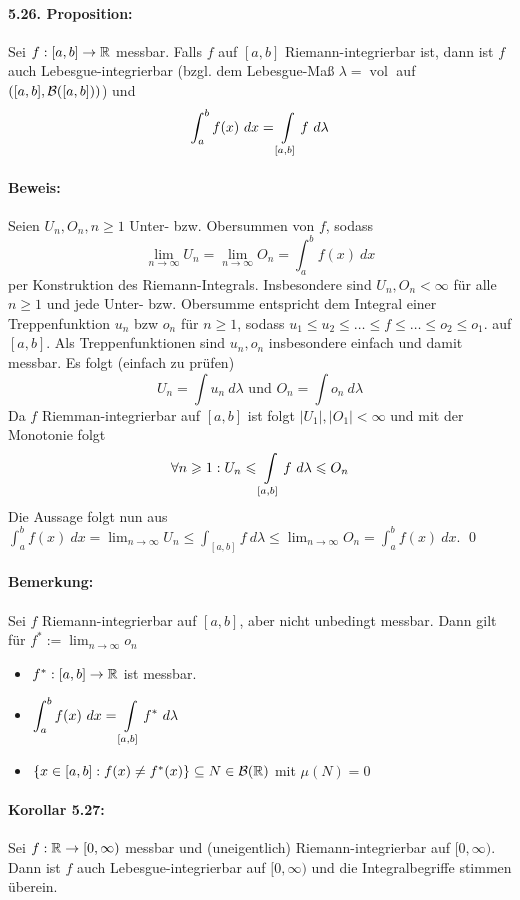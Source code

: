  \paragraph{5.26. Proposition:}Sei $f:[a,b]\to\R$ messbar. Falls $f$ auf $[a,b]$ Riemann-integrierbar ist, dann ist $f$ auch Lebesgue-integrierbar (bzgl. dem Lebesgue-Ma\ss{} $\lambda=\operatorname{vol}$ auf $([a,b],\cB([a,b]))$) und
 $$\int_a^b f(x)\ dx=\int\displaylimits_{[a,b]}f\ d\lambda$$
 
 \paragraph{Beweis:}Seien $U_n,O_n,n\geq1$ Unter- bzw. Obersummen von $f$, sodass
 $$\lim_{n\to\infty}U_n=\lim_{n\to\infty}O_n=\int_a^b f(x)\ dx$$
 per Konstruktion des Riemann-Integrals. Insbesondere sind $U_n,O_n<\infty$ f\"ur alle $n\geq1$ und jede Unter- bzw. Obersumme entspricht dem Integral einer Treppenfunktion $u_n$ bzw $o_n$ f\"ur $n\geq1$, sodass $u_1\leq u_2\leq\hdots\leq f\leq\hdots\leq o_2\leq o_1$. 
 auf $[a,b]$. Als Treppenfunktionen sind $u_n,o_n$ insbesondere einfach und damit messbar. Es folgt (einfach zu pr\"ufen)
 $$U_n=\int u_n\ d\lambda\text{ und }O_n=\int o_n\ d\lambda$$ 
 Da $f$ Riemman-integrierbar auf $[a,b]$ ist folgt $|U_1|,|O_1|<\infty$ und mit der Monotonie folgt
 $$\forall n\geq1:U_n\leq\int\displaylimits_{[a,b]}f\ d\lambda\leq O_n$$
 Die Aussage folgt nun aus $\int_a^b f(x)\ dx=\lim_{n\to\infty}U_n\leq\int_{[a,b]}f\ d\lambda\leq\lim_{n\to\infty}O_n=\int_a^b f(x)\ dx$. \qed
 
 \paragraph{Bemerkung:}Sei $f$ Riemann-integrierbar auf $[a,b]$, aber nicht unbedingt messbar. Dann gilt f\"ur $f^*:=\displaystyle\lim_{n\to\infty}o_n$
 \begin{itemize}
     \item $f^*:[a,b]\to\R$ ist messbar.
     \item $\displaystyle\int_a^b f(x)\ dx=\int\displaylimits_{[a,b]}f^*\ d\lambda$
     \item $\left\{x\in[a,b]:f(x)\neq f^*(x)\right\}\subseteq N\in\borel$ mit $\mu(N)=0$
 \end{itemize}
 
 \paragraph{Korollar 5.27:} Sei $f:\R\to[0,\infty)$ messbar und (uneigentlich) Riemann-integrierbar auf $[0,\infty)$. Dann ist $f$ auch Lebesgue-integrierbar auf $[0,\infty)$ und die Integralbegriffe stimmen \"uberein.
 

